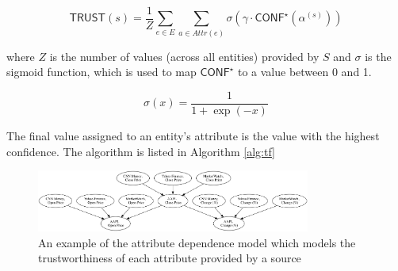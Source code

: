 \documentclass{acm_proc_article-sp}
\begin{document}
\begin{equation}
\mathsf{TRUST}(s) = \frac{1}{Z} \sum_{e \in E}\sum_{a \in Attr(e)} \sigma(\gamma \cdot \mathsf{CONF}^\star(\alpha^{(s)}))
\end{equation}

where $Z$ is the number of values (across all entities) provided by $S$ and $\sigma$ is the sigmoid function, which is used to map $\mathsf{CONF}^\star$ to a value between 0 and 1.

\begin{equation}
\sigma(x) = \frac{1}{1 + \exp{(-x)}}
\end{equation}

The final value assigned to an entity's attribute is the value with the highest confidence. The algorithm is listed in Algorithm \ref{alg:tf} 


\begin{figure}
\centering
\includegraphics[width=9cm]{bn2.png}
\caption{An example of the attribute dependence model which models the trustworthiness of each attribute provided by a source}
\end{figure}
\end{document}
